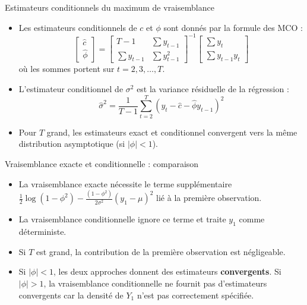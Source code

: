 \documentclass[11pt,aspectratio=169]{beamer}
\begin{document}
\begin{frame}{Estimateurs conditionnels du maximum de vraisemblance}

\begin{itemize}

\item Les estimateurs conditionnels de $c$ et $\phi$ sont donnés par la formule des MCO :
  \[
  \begin{bmatrix} \hat{c} \\ \hat{\phi} \end{bmatrix} = \begin{bmatrix} T-1 & \sum y_{t-1} \\ \sum y_{t-1} & \sum y_{t-1}^2 \end{bmatrix}^{-1} \begin{bmatrix} \sum y_t \\ \sum y_{t-1} y_t \end{bmatrix}
  \]
  où les sommes portent sur $t = 2, 3, \ldots, T$.\newline

\item L'estimateur conditionnel de $\sigma^2$ est la variance résiduelle de la régression :
  \[
  \hat{\sigma}^2 = \frac{1}{T-1} \sum_{t=2}^{T} (y_t - \hat{c} - \hat{\phi} y_{t-1})^2
  \]\newline

\item Pour $T$ grand, les estimateurs exact et conditionnel convergent vers la même distribution asymptotique (si $|\phi| < 1$).

\end{itemize}

\end{frame}

\begin{frame}{Vraisemblance exacte et conditionnelle : comparaison}

\begin{itemize}

\item La vraisemblance exacte nécessite le terme supplémentaire $\frac{1}{2}\log(1 - \phi^2) - \frac{(1-\phi^2)}{2\sigma^2}(y_1 - \mu)^2$ lié à la première observation.\newline

\item La vraisemblance conditionnelle ignore ce terme et traite $y_1$ comme déterministe.\newline

\item Si $T$ est grand, la contribution de la première observation est négligeable.\newline

\item Si $|\phi| < 1$, les deux approches donnent des estimateurs \textbf{convergents}. Si $|\phi| > 1$, la vraisemblance conditionnelle ne fournit pas d'estimateurs convergents car la densité de $Y_1$ n'est pas correctement spécifiée.

\end{itemize}

\end{frame}
\end{document}
